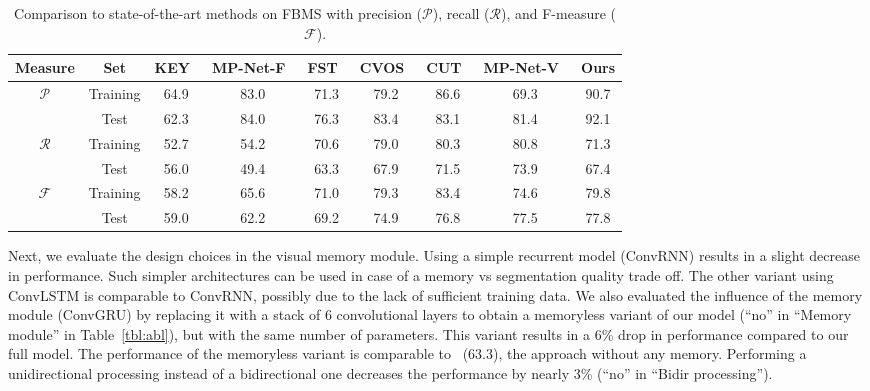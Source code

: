 \documentclass[10pt,twocolumn,letterpaper]{article}
\begin{document}
\begin{table*}[t]
\begin{center}
\begin{tabular}{c|c|c c c c c c c }
\hline
Measure & Set & KEY~\cite{lee2011key} & MP-Net-F~\cite{tokmakov2016learning} & FST~\cite{papazoglou2013fast} & CVOS~\cite{taylor2015causal} & CUT~\cite{keuper2015motion} & MP-Net-V~\cite{tokmakov2016learning} & Ours \\
\hline
\multirow{2}{*}{$\mathcal{P}$} & Training & 64.9 & 83.0 & 71.3 & 79.2 & 86.6 & 69.3 & 90.7 \\
& Test & 62.3 & 84.0 & 76.3 & 83.4 & 83.1 & 81.4 & 92.1 \\
\hline
\multirow{2}{*}{$\mathcal{R}$} & Training & 52.7 & 54.2 & 70.6 & 79.0 & 80.3 & 80.8 & 71.3 \\
 & Test & 56.0 & 49.4 & 63.3 & 67.9 & 71.5 & 73.9 & 67.4 \\
\hline
\multirow{2}{*}{$\mathcal{F}$} & Training & 58.2 & 65.6 & 71.0 & 79.3 & 83.4 & 74.6 & 79.8 \\
 & Test & 59.0 & 62.2 & 69.2 & 74.9 & 76.8 & 77.5 & 77.8 \\
\hline
\end{tabular}
\vspace{0.1cm}
\caption{Comparison to state-of-the-art methods on FBMS with precision ($\mathcal{P}$), recall ($\mathcal{R}$), and F-measure ($\mathcal{F}$).}
\label{tbl:bms}
\vspace{-0.5cm}
\end{center}
\end{table*}

Next, we evaluate the design choices in the visual memory module. Using a
simple recurrent model (ConvRNN) results in a slight decrease in performance.
Such simpler architectures can be used in case of a memory vs segmentation
quality trade off. The other variant using ConvLSTM is comparable to ConvRNN,
possibly due to the lack of sufficient training data. We also evaluated the
influence of the memory module (ConvGRU) by replacing it with a stack of 6
convolutional layers to obtain a memoryless variant of our model (``no'' in
``Memory module'' in Table~\ref{tbl:abl}), but with the same number of
parameters. This variant results in a 6\% drop in performance compared to our
full model. The performance of the memoryless variant is comparable
to~\cite{tokmakov2016learning} (63.3), the approach without any memory.
Performing a unidirectional processing instead of a bidirectional one decreases
the performance by nearly 3\% (``no'' in ``Bidir processing'').
\end{document}
